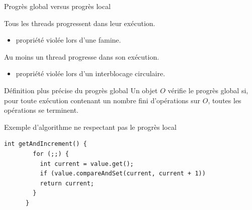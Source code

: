 
\begingroup

\begin{frame}[fragile]{Progrès global versus progrès local}

  \begin{description}
  \item[Progrès local :] \alert{Tous les threads} progressent dans leur exécution.
    \begin{itemize}
    \item propriété violée lors d'une famine.
    \end{itemize}
  \item[Progrès global :] \alert{Au moins un} thread progresse dans son exécution.
    \begin{itemize}
    \item propriété violée lors d'un interblocage circulaire.
    \end{itemize}
  \end{description}
  
  \begin{block}{Définition plus précise du progrès global}
    Un objet $O$ vérifie le progrès global si, pour toute exécution
    contenant un nombre fini d'opérations sur $O$,
    toutes les opérations se terminent.
  \end{block}

  \begin{exampleblock}{Exemple d'algorithme ne respectant pas le progrès local}
    \begin{lstlisting}[gobble=6]
      int getAndIncrement() {
        for (;;) {
          int current = value.get();
          if (value.compareAndSet(current, current + 1))
          return current;
        }
      }
    \end{lstlisting}
  \end{exampleblock}

\end{frame}

\endgroup
\endinput
